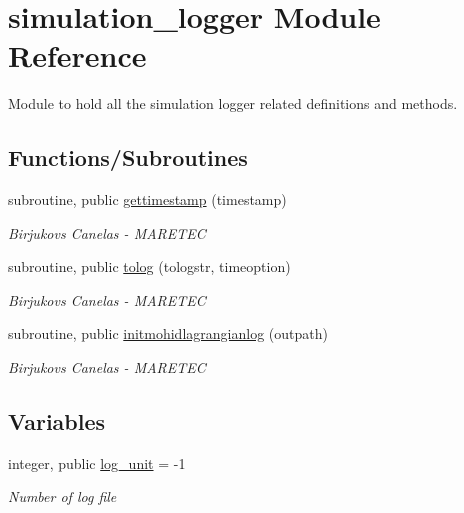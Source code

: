 \hypertarget{namespacesimulation__logger}{}\section{simulation\+\_\+logger Module Reference}
\label{namespacesimulation__logger}


Module to hold all the simulation logger related definitions and methods.  


\subsection*{Functions/\+Subroutines}
\begin{DoxyCompactItemize}
\item 
subroutine, public \hyperlink{namespacesimulation__logger_a13446c36aac51547a72b39003f735257}{gettimestamp} (timestamp)
\begin{DoxyCompactList}\small\item\em Birjukovs Canelas -\/ M\+A\+R\+E\+T\+EC \end{DoxyCompactList}\item 
subroutine, public \hyperlink{namespacesimulation__logger_a3aaa69ec168b6f34d703fb4033a22d92}{tolog} (tologstr, timeoption)
\begin{DoxyCompactList}\small\item\em Birjukovs Canelas -\/ M\+A\+R\+E\+T\+EC \end{DoxyCompactList}\item 
subroutine, public \hyperlink{namespacesimulation__logger_a9c7922c1d3cd57c8322f047799fc6053}{initmohidlagrangianlog} (outpath)
\begin{DoxyCompactList}\small\item\em Birjukovs Canelas -\/ M\+A\+R\+E\+T\+EC \end{DoxyCompactList}\end{DoxyCompactItemize}
\subsection*{Variables}
\begin{DoxyCompactItemize}
\item 
integer, public \hyperlink{namespacesimulation__logger_a9ef3d703b0c79dd563330003a82c99d9}{log\+\_\+unit} = -\/1
\begin{DoxyCompactList}\small\item\em \textquotesingle{}Number\textquotesingle{} of log file \end{DoxyCompactList}\end{DoxyCompactItemize}


